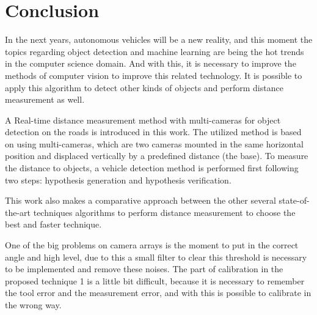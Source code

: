 \chapter{Conclusion}
\label{capitulo6}


In the next years, autonomous vehicles will be a new reality, and this moment the topics regarding object detection and machine learning are being the hot trends in the computer science domain. And with this, it is necessary to improve the methods of computer vision to improve this related technology. It is possible to apply this algorithm to detect other kinds of objects and perform distance measurement as well. 

A Real-time distance measurement method with multi-cameras for object detection on the roads is introduced in this work. The utilized method is based on using multi-cameras, which are two cameras mounted in the same horizontal position and displaced vertically by a predefined distance (the base). To measure the distance to objects, a vehicle detection method is performed first following two steps: hypothesis generation and hypothesis verification. 


This work also makes a comparative approach between the other several state-of-the-art techniques algorithms to perform distance measurement to choose the best and faster technique. 

One of the big problems on camera arrays is the moment to put in the correct angle and high level, due to this a small filter to clear this threshold is necessary to be implemented and remove these noises. The part of calibration in the proposed technique 1 is a little bit difficult, because it is necessary to remember the tool error and the measurement error, and with this is possible to calibrate in the wrong way. 

